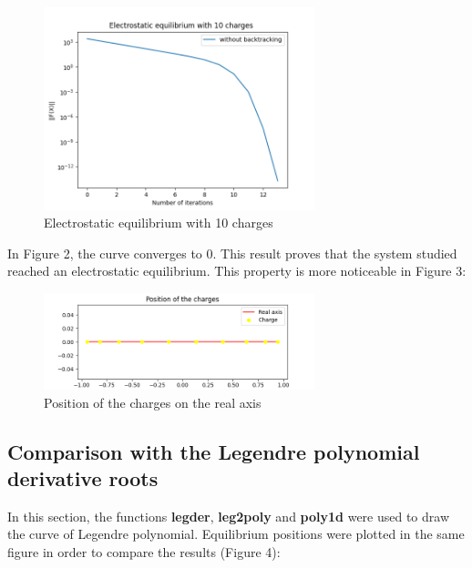\documentclass{article}
\begin{document}
    
    \begin{figure}[!htb]
    \centering
    \includegraphics[width=0.7\textwidth]{equilibrium.png}
    \caption{Electrostatic equilibrium with 10 charges}
\end{figure}
\vspace{1cm}

\newpage
In Figure 2, the curve converges to 0. This result proves that the system studied reached an electrostatic equilibrium. This property is more noticeable in Figure 3:
\vspace{1cm}

    \begin{figure}[!h]
    \centering
    \includegraphics[width=0.7\textwidth]{position_real_axis.png}
    \caption{Position of the charges on the real axis}
\end{figure}


\subsection{Comparison with the Legendre polynomial derivative roots }
In this section, the functions \textbf{legder}, \textbf{leg2poly} and \textbf{poly1d} were used to draw the curve of Legendre polynomial. Equilibrium positions were plotted in the same figure in order to compare the results (Figure 4):
\end{document}
